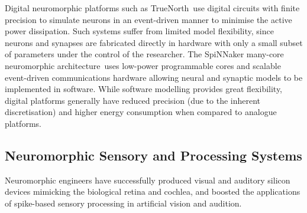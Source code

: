 Digital neuromorphic platforms such as TrueNorth~\DIFdelbegin {}\DIFdelend \DIFaddbegin {}\DIFaddend use digital circuits with finite precision to simulate neurons in an event-driven manner to minimise the active power dissipation.
Such systems suffer from limited model flexibility, since neurons and synapses are fabricated directly in hardware with only a small subset of parameters under the control of the researcher.
The SpiNNaker many-core neuromorphic architecture~\DIFdelbegin {}\DIFdelend \DIFaddbegin {}\DIFaddend uses low-power programmable cores and scalable event-driven communications hardware allowing neural and synaptic models to be implemented in software.
While software modelling provides great flexibility, digital platforms generally have reduced precision (due to the inherent discretisation) and higher energy consumption when compared to analogue platforms.

\subsection{Neuromorphic Sensory and Processing Systems}
\label{sec:morph}
Neuromorphic engineers have successfully produced visual and auditory silicon devices mimicking the biological retina and cochlea, and boosted the applications of spike-based sensory processing in artificial vision and audition.

